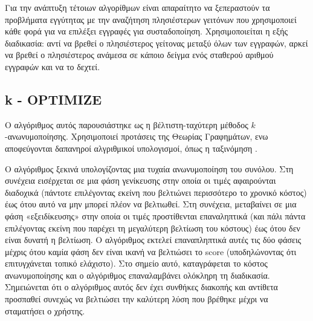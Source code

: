 Για την ανάπτυξη τέτοιων αλγορίθμων είναι απαραίτητο να ξεπεραστούν τα προβλήματα εγγύτητας με την αναζήτηση πλησιέστερων γειτόνων που χρησιμοποιεί κάθε φορά για να επιλέξει εγγραφές για συσταδοποίηση. Χρησιμοποιείται η εξής διαδικασία:
αντί να βρεθεί ο πλησιέστερος γείτονας μεταξύ όλων των εγγραφών, αρκεί να βρεθεί ο πλησιέστερος ανάμεσα σε κάποιο δείγμα ενός σταθερού αριθμού εγγραφών και να το δεχτεί. 



\subsection{ \textlatin{k - OPTIMIZE}}

Ο αλγόριθμος αυτός παρουσιάστηκε ως η βέλτιστη-ταχύτερη μέθοδος $k$-ανωνυμοποίησης.
Χρησιμοποιεί προτάσεις της Θεωρίας Γραφημάτων, ενω αποφεύγονται δαπανηροί αλγριθμικοί υπολογισμοί, όπως η ταξινόμηση \textlatin{\cite{Bayardo:2005:DPT:1053724.1054048}}.


Ο αλγόριθμος ξεκινά υπολογίζοντας μια τυχαία ανωνυμοποίηση του συνόλου. 
Στη συνέχεια εισέρχεται σε μια φάση γενίκευσης στην οποία οι τιμές αφαιρούνται διαδοχικά (πάντοτε επιλέγοντας εκείνη που βελτιώνει περισσότερο το χρονικό κόστος) έως ότου αυτό να μην μπορεί πλέον να βελτιωθεί.
Στη συνέχεια, μεταβαίνει σε μια φάση «εξειδίκευσης» στην οποία οι τιμές προστίθενται επαναληπτικά (και πάλι πάντα επιλέγοντας εκείνη που παρέχει τη μεγαλύτερη βελτίωση του κόστους) έως ότου δεν είναι δυνατή η βελτίωση. 
Ο αλγόριθμος εκτελεί επαναπληπτικά αυτές τις δύο φάσεις μέχρις ότου καμία φάση δεν είναι ικανή να βελτιώσει το \textlatin{score} (υποδηλώνοντας ότι επιτυγχάνεται τοπικό ελάχιστο).
Στο σημείο αυτό, καταγράφεται το κόστος ανωνυμοποίησης και ο αλγόριθμος επαναλαμβάνει ολόκληρη τη διαδικασία. Σημειώνεται ότι ο αλγόριθμος αυτός δεν έχει συνθήκες διακοπής και αντίθετα προσπαθεί συνεχώς να βελτιώσει την καλύτερη λύση που βρέθηκε μέχρι να σταματήσει ο χρήστης.






